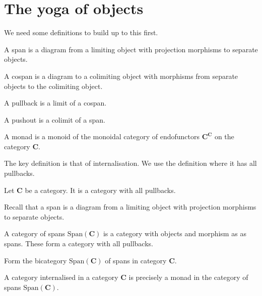 \section{The yoga of objects}

We need some definitions to build up to this first.

\begin{definition}[Span]
	\label{definition-span}
	A span is a diagram from a limiting object with projection morphisms to separate objects.
\end{definition}

\begin{definition}[Cospan]
	\label{definition-cospan}
	A cospan is a diagram to a colimiting object with morphisms from separate objects to the colimiting object.
\end{definition}

\begin{definition}[Pullback]
	\label{definition-pullback}
	A pullback is a limit of a cospan.
\end{definition}

\begin{definition}[Pushout]
	\label{definition-pushout}
	A pushout is a colimit of a span.
\end{definition}

\begin{definition}[Monad]
	\label{definition-monad}
	A monad is a monoid of the monoidal category of endofunctors $\mathbf{C}^\mathbf{C}$ on the category $\mathbf{C}$.
\end{definition}

The key definition is that of internalisation.
We use the definition where it has all pullbacks.

\begin{definition}
	\label{definition-internal-category}

	Let $\mathbf{C}$ be a category.
	It is a category with all pullbacks.

	Recall that a span is a diagram from a limiting object with projection morphisms to separate objects.

	A category of spans $\mathrm{Span}(\mathbf{C})$ is a category with objects and morphism as as spans. These form a category with all pullbacks.

	Form the bicategory $\mathrm{Span}(\mathbf{C})$ of spans in category $\mathbf{C}$.

	A category internalised in a category $\mathbf{C}$ is precisely a monad in the category of spans $\mathrm{Span}(\mathbf{C})$.
\end{definition}

